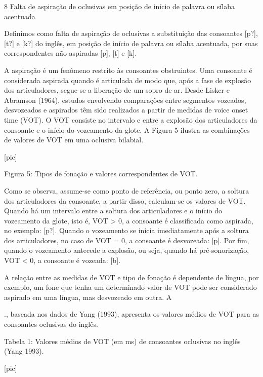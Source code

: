 8 Falta de aspira\c{c}\~ao de oclusivas em posi\c{c}\~ao de in\'icio de palavra ou
s\'ilaba acentuada

Definimos como falta de aspira\c{c}\~ao de oclusivas a substitui\c{c}\~ao das
consoantes {[}p?{]}, {[}t?{]} e {[}k?{]} do ingl\^es, em posi\c{c}\~ao de in\'icio
de palavra ou s\'ilaba acentuada, por suas correspondentes n\~ao-aspiradas
{[}p{]}, {[}t{]} e {[}k{]}.

A aspira\c{c}\~ao \'e um fen\^omeno restrito às consoantes obstruintes. Uma
consoante \'e considerada aspirada quando \'e articulada de modo que, ap\'os a
fase de explos\~ao dos articuladores, segue-se a libera\c{c}\~ao de um sopro de
ar. Desde Lisker e Abramson (1964), estudos envolvendo compara\c{c}\~oes entre
segmentos vozeados, desvozeados e aspirados t\^em sido realizados a partir
de medidas de voice onset time (VOT). O VOT consiste no intervalo e
entre a explos\~ao dos articuladores da consoante e o in\'icio do vozeamento
da glote. A Figura 5 ilustra as combina\c{c}\~oes de valores de VOT em uma
oclusiva bilabial.

                                [pic]

    Figura 5: Tipos de fona\c{c}\~ao e valores correspondentes de VOT.

Como se observa, assume-se como ponto de refer\^encia, ou ponto zero, a
soltura dos articuladores da consoante, a partir disso, calculam-se os
valores de VOT. Quando h\'a um intervalo entre a soltura dos articuladores
e o in\'icio do vozeamento da glote, isto \'e, VOT \textgreater{} 0, a
consoante \'e classificada como aspirada, no exemplo: {[}p?{]}. Quando o
vozeamento se inicia imediatamente ap\'os a soltura dos articuladores, no
caso de VOT = 0, a consoante \'e desvozeada: {[}p{]}. Por fim, quando o
vozeamento antecede a explos\~ao, ou seja, quando h\'a pr\'e-sonoriza\c{c}\~ao, VOT
\textless{} 0, a consoante \'e vozeada: {[}b{]}.

A rela\c{c}\~ao entre as medidas de VOT e tipo de fona\c{c}\~ao \'e dependente de
l\'ingua, por exemplo, um fone que tenha um determinado valor de VOT pode
ser considerado aspirado em uma l\'ingua, mas desvozeado em outra. A

., baseada nos dados de Yang (1993), apresenta os valores m\'edios de VOT
para as consoantes oclusivas do ingl\^es.

        Tabela 1: Valores m\'edios de VOT (em ms) de consoantes
                  oclusivas no ingl\^es (Yang 1993).

                                [pic]

